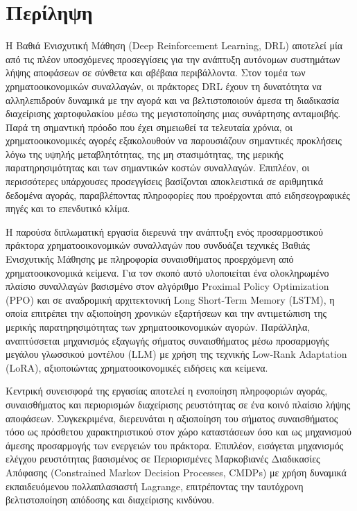 


\chapter*{Περίληψη}
Η Βαθιά Ενισχυτική Μάθηση (Deep Reinforcement Learning, DRL) αποτελεί μία από τις πλέον υποσχόμενες προσεγγίσεις για την ανάπτυξη αυτόνομων 
συστημάτων λήψης αποφάσεων σε σύνθετα και αβέβαια περιβάλλοντα. Στον τομέα των χρηματοοικονομικών συναλλαγών, οι πράκτορες DRL έχουν τη 
δυνατότητα να αλληλεπιδρούν δυναμικά με την αγορά και να βελτιστοποιούν άμεσα τη διαδικασία διαχείρισης χαρτοφυλακίου μέσω της μεγιστοποίησης 
μιας συνάρτησης ανταμοιβής. Παρά τη σημαντική πρόοδο που έχει σημειωθεί τα τελευταία χρόνια, οι χρηματοοικονομικές αγορές εξακολουθούν να παρουσιάζουν 
σημαντικές προκλήσεις λόγω της υψηλής μεταβλητότητας, της μη στασιμότητας, της μερικής παρατηρησιμότητας και των σημαντικών κοστών συναλλαγών. 
Επιπλέον, οι περισσότερες υπάρχουσες προσεγγίσεις βασίζονται αποκλειστικά σε αριθμητικά δεδομένα αγοράς, παραβλέποντας πληροφορίες που προέρχονται 
από ειδησεογραφικές πηγές και το επενδυτικό κλίμα.

Η παρούσα διπλωματική εργασία διερευνά την ανάπτυξη ενός προσαρμοστικού πράκτορα χρηματοοικονομικών συναλλαγών που συνδυάζει τεχνικές Βαθιάς 
Ενισχυτικής Μάθησης με πληροφορία συναισθήματος προερχόμενη από χρηματοοικονομικά κείμενα. Για τον σκοπό αυτό υλοποιείται ένα ολοκληρωμένο 
πλαίσιο συναλλαγών βασισμένο στον αλγόριθμο Proximal Policy Optimization (PPO) και σε αναδρομική αρχιτεκτονική Long Short-Term Memory (LSTM), 
η οποία επιτρέπει την αξιοποίηση χρονικών εξαρτήσεων και την αντιμετώπιση της μερικής παρατηρησιμότητας των χρηματοοικονομικών αγορών. 
Παράλληλα, αναπτύσσεται μηχανισμός εξαγωγής σήματος συναισθήματος μέσω προσαρμογής μεγάλου γλωσσικού μοντέλου (LLM) με χρήση της τεχνικής Low-Rank 
Adaptation (LoRA), αξιοποιώντας χρηματοοικονομικές ειδήσεις και κείμενα.

Κεντρική συνεισφορά της εργασίας αποτελεί η ενοποίηση πληροφοριών αγοράς, συναισθήματος και περιορισμών διαχείρισης ρευστότητας σε ένα κοινό πλαίσιο 
λήψης αποφάσεων. Συγκεκριμένα, διερευνάται η αξιοποίηση του σήματος συναισθήματος τόσο ως πρόσθετου χαρακτηριστικού στον χώρο καταστάσεων όσο και ως 
μηχανισμού άμεσης προσαρμογής των ενεργειών του πράκτορα. Επιπλέον, εισάγεται μηχανισμός ελέγχου ρευστότητας βασισμένος σε Περιορισμένες Μαρκοβιανές 
Διαδικασίες Απόφασης (Constrained Markov Decision Processes, CMDPs) με χρήση δυναμικά εκπαιδευόμενου πολλαπλασιαστή Lagrange, επιτρέποντας την ταυτόχρονη 
βελτιστοποίηση απόδοσης και διαχείρισης κινδύνου.

